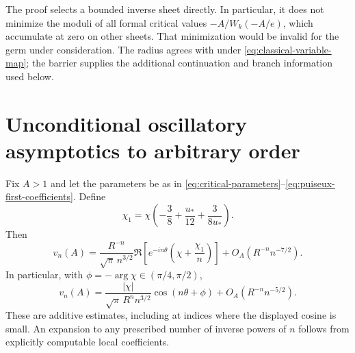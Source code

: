 The proof selects a bounded inverse sheet directly.  In particular, it
does not minimize the moduli of all formal critical values
$-A/W_k(-A/e)$, which accumulate at zero on other sheets.  That
minimization would be invalid for the germ under consideration.  The
radius agrees with \cite[Eq.~(2.9)]{KaluginJeffrey2012} under
\eqref{eq:classical-variable-map}; the barrier supplies the additional
continuation and branch information used below.

\section{Unconditional oscillatory asymptotics to arbitrary order}
\label{sec:velocity-asymptotics}

\begin{theorem}
\label{thm:velocity-asymptotics}
Fix $A>1$ and let the parameters be as in
\eqref{eq:critical-parameters}--\eqref{eq:puiseux-first-coefficients}.
Define
\begin{equation}\label{eq:chi-correction}
 \chi_1=\chi\left(-\frac38+\frac{u_*}{12}+\frac3{8u_*}\right).
\end{equation}
Then
\begin{equation}\label{eq:velocity-two-term}
 v_n(A)=\frac{R^{-n}}{\sqrt\pi\,n^{3/2}}
    \Re\left[e^{-in\theta}
                      \left(\chi+\frac{\chi_1}{n}\right)\right]
           +O_A(R^{-n}n^{-7/2}).
\end{equation}
In particular, with $\phi=-\arg\chi\in(\pi/4,\pi/2)$,
\begin{equation}\label{eq:velocity-leading-cosine}
 v_n(A)=\frac{|\chi|}{\sqrt\pi\,R^n n^{3/2}}
               \cos(n\theta+\phi)+O_A(R^{-n}n^{-5/2}).
\end{equation}
These are additive estimates, including at indices where the displayed
cosine is small.  An expansion to any prescribed number of inverse
powers of $n$ follows from explicitly computable local coefficients.
\end{theorem}


